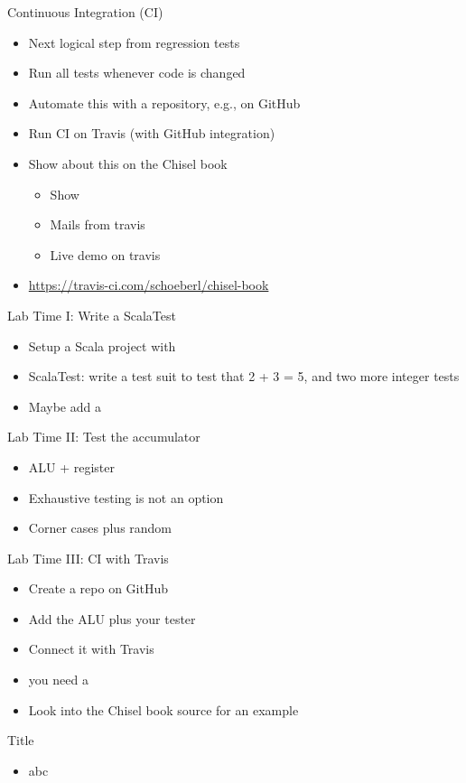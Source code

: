 \begin{frame}[fragile]{Continuous Integration (CI)}
\begin{itemize}
\item Next logical step from regression tests
\item Run all tests whenever code is changed
\item Automate this with a repository, e.g., on GitHub
\item Run CI on Travis (with GitHub integration)
\item Show about this on the Chisel book
\begin{itemize}
\item Show 
\item Mails from travis
\item Live demo on travis
\end{itemize}
\item \url{https://travis-ci.com/schoeberl/chisel-book}
\end{itemize}
\end{frame}

\begin{frame}[fragile]{Lab Time I: Write a ScalaTest}
\begin{itemize}
\item Setup a Scala project with 
\item ScalaTest: write a test suit to test  that 2 + 3 = 5, and two more integer tests
\item Maybe add a 
\end{itemize}
\end{frame}

\begin{frame}[fragile]{Lab Time II: Test the accumulator}
\begin{itemize}
\item ALU + register
\item Exhaustive testing is not an option
\item Corner cases plus random
\end{itemize}
\end{frame}

\begin{frame}[fragile]{Lab Time III: CI with Travis}
\begin{itemize}
\item Create a repo on GitHub
\item Add the ALU plus your tester
\item Connect it with Travis
\item you need a 
\item Look into the Chisel book source for an example
\end{itemize}
\end{frame}



\begin{frame}[fragile]{Title}
\begin{itemize}
\item abc
\end{itemize}
\end{frame}
